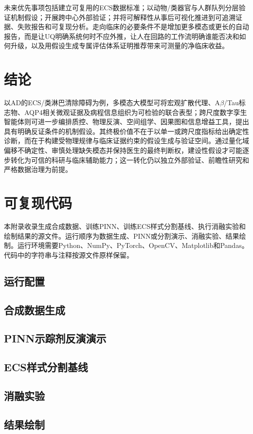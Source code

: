 ﻿\documentclass[11pt,a4paper]{article}
\begin{document}
未来优先事项包括建立可复用的ECS数据标准；以动物/类器官与人群队列分层验证机制假设；开展跨中心外部验证；并将可解释性从事后可视化推进到可追溯证据、失败报告和可复现分析。走向临床的必要条件不是增加更多模态或更长的自动报告，而是让UQ明确系统何时不应外推，让人在回路的工作流明确谁能否决和如何升级，以及用假设生成专属评估体系证明推荐带来可测量的净临床收益。

\section{结论}
以AD的ECS/类淋巴清除障碍为例，多模态大模型可将宏观扩散代理、A$\beta$/Tau标志物、AQP4相关微观证据及病程信息组织为可检验的联合表型；跨尺度数字孪生智能体则可进一步编排质控、物理反演、空间组学、因果图和信息增益工具，提出具有明确反证条件的机制假设。其终极价值不在于以单一或跨尺度指标给出确定性诊断，而在于构建受物理规律与临床证据约束的假设生成与验证空间。通过量化域偏移不确定性、审慎处理缺失模态并保持医生的最终判断权，建设性假设才可能逐步转化为可信的科研与临床辅助能力；这一转化仍以独立外部验证、前瞻性研究和严格数据治理为前提。

\appendix
\section{可复现代码}
本附录收录生成合成数据、训练PINN、训练ECS样式分割基线、执行消融实验和绘制结果的源文件。运行顺序为数据生成、PINN或分割演示、消融实验、结果绘制。运行环境需要Python、NumPy、PyTorch、OpenCV、Matplotlib和Pandas。代码中的字符串与注释按源文件原样保留。

\subsection{运行配置}


\subsection{合成数据生成}


\subsection{PINN示踪剂反演演示}


\subsection{ECS样式分割基线}


\subsection{消融实验}


\subsection{结果绘制}


\printbibliography
\end{document}
